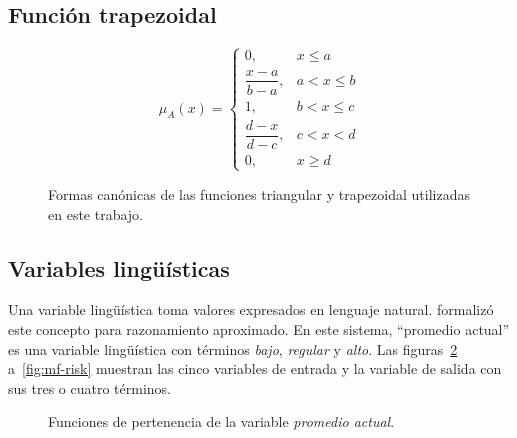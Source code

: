 \subsection{Función trapezoidal}

\begin{equation}
\mu_A(x)=
\begin{cases}
0, & x \leq a \\
\dfrac{x-a}{b-a}, & a < x \leq b \\
1, & b < x \leq c \\
\dfrac{d-x}{d-c}, & c < x < d \\
0, & x \geq d
\end{cases}
\label{eq:trapezoidal}
\end{equation}

\begin{figure}[H]
  \centering
  \caption{Formas canónicas de las funciones triangular y trapezoidal utilizadas en este trabajo.}
  \label{fig:formas-canonicas}
\end{figure}

\subsection{Variables lingüísticas}

Una variable lingüística toma valores expresados en lenguaje natural. \citet{zadeh1975linguistic} formalizó este concepto para razonamiento aproximado. En este sistema, ``promedio actual'' es una variable lingüística con términos \emph{bajo}, \emph{regular} y \emph{alto}. Las figuras~\ref{fig:mf-average} a~\ref{fig:mf-risk} muestran las cinco variables de entrada y la variable de salida con sus tres o cuatro términos.

\begin{figure}[H]
  \centering
  \caption{Funciones de pertenencia de la variable \emph{promedio actual}.}
  \label{fig:mf-average}
\end{figure}

